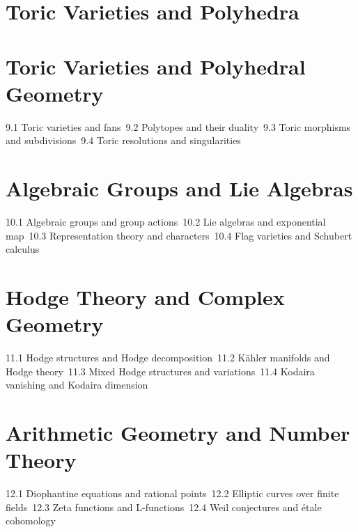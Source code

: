 \section{Toric Varieties and Polyhedra}
\section{Toric Varieties and Polyhedral Geometry}
9.1 Toric varieties and fans\
9.2 Polytopes and their duality\
9.3 Toric morphisms and subdivisions\
9.4 Toric resolutions and singularities\
\section{Algebraic Groups and Lie Algebras}
10.1 Algebraic groups and group actions\
10.2 Lie algebras and exponential map\
10.3 Representation theory and characters\
10.4 Flag varieties and Schubert calculus\
\section{Hodge Theory and Complex Geometry}
11.1 Hodge structures and Hodge decomposition\
11.2 Kähler manifolds and Hodge theory\
11.3 Mixed Hodge structures and variations\
11.4 Kodaira vanishing and Kodaira dimension\
\section{Arithmetic Geometry and Number Theory}
12.1 Diophantine equations and rational points\
12.2 Elliptic curves over finite fields\
12.3 Zeta functions and L-functions\
12.4 Weil conjectures and étale cohomology\
